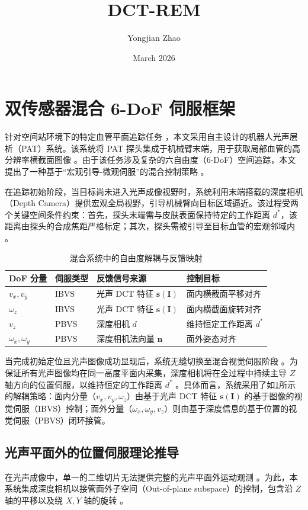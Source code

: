 \documentclass{article}
\title{DCT-REM}
\author{Yongjian Zhao}
\date{March 2026}
\begin{document}
\maketitle
\section{双传感器混合 6-DoF 伺服框架}
\label{sec:6dof_framework}
针对空间站环境下的特定血管平面追踪任务 ，本文采用自主设计的机器人光声层析（PAT）系统。该系统将 PAT 探头集成于机械臂末端，用于获取局部血管的高分辨率横截面图像 。由于该任务涉及复杂的六自由度（6-DoF）空间追踪，本文提出了一种基于“宏观引导-微观伺服”的混合控制策略 。

在追踪初始阶段，当目标尚未进入光声成像视野时，系统利用末端搭载的深度相机（Depth Camera）提供宏观全局视野，引导机械臂向目标区域逼近。该过程受两个关键空间条件约束：首先，探头末端需与皮肤表面保持特定的工作距离 $d^*$，该距离由探头的合成焦距严格标定；其次，探头需被引导至目标血管的宏观邻域内 。

\begin{table}[htbp]
    \centering
    \caption{混合系统中的自由度解耦与反馈映射 }
    \label{tab:dof_decoupling}
    \begin{tabularx}{\columnwidth}{XXXX}
        \toprule
        \textbf{DoF 分量} & \textbf{伺服类型} & \textbf{反馈信号来源} & \textbf{控制目标} \\
        \midrule
        $v_x, v_y$ & IBVS & 光声 DCT 特征 $\mathbf{s}(\mathbf{I})$ & 面内横截面平移对齐 \\
        $\omega_z$ & IBVS & 光声 DCT 特征 $\mathbf{s}(\mathbf{I})$ & 面内横截面旋转对齐 \\
        $v_z$ & PBVS & 深度相机 $d$ & 维持恒定工作距离 $d^*$ \\
        $\omega_x, \omega_y$ & PBVS & 深度相机法向量 $\mathbf{n}$ & 面外姿态对齐 \\
        \bottomrule
    \end{tabularx}
\end{table}

当完成初始定位且光声图像成功显现后，系统无缝切换至混合视觉伺服阶段 。为保证所有光声图像均在同一高度平面内采集，深度相机将在全过程中持续主导 $Z$ 轴方向的位置伺服，以维持恒定的工作距离 $d^*$ 。具体而言，系统采用了如\cref{tab:dof_decoupling}所示的解耦策略：面内分量（$v_x, v_y, \omega_z$）由基于光声 DCT 特征 $\mathbf{s}(\mathbf{I})$ 的基于图像的视觉伺服（IBVS）控制；面外分量（$\omega_x, \omega_y, v_z$）则由基于深度信息的基于位置的视觉伺服（PBVS）闭环接管。

\subsection{光声平面外的位置伺服理论推导}
\label{sec:out_of_plane}
在光声成像中，单一的二维切片无法提供完整的光声平面外运动观测 。为此，本系统集成深度相机以接管面外子空间（Out-of-plane subspace）的控制，包含沿 $Z$ 轴的平移以及绕 $X, Y$ 轴的旋转 。
\end{document}
